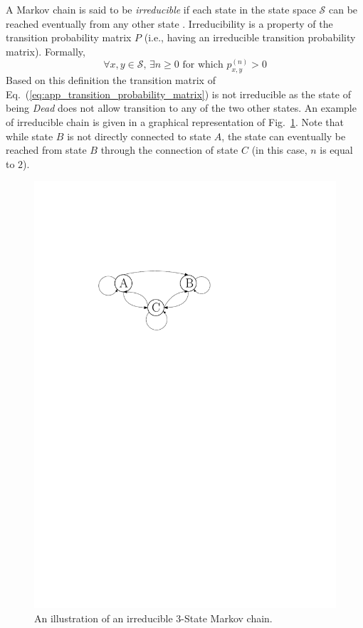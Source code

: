 A Markov chain is said to be \emph{irreducible} if each state in the state space $\mathcal{S}$ can be reached eventually from any other state \cite{Robert2004,Sargent2017}.
Irreducibility is a property of the transition probability matrix $P$ (i.e., having an irreducible transition probability matrix).
Formally,
\begin{equation}
	\forall x, y \in \mathcal{S}, \, \exists n \geq 0 \,\, \text{for which} \,\, p_{x,y}^{(n)} > 0
\label{eq:app_irreducibility}
\end{equation}
Based on this definition the transition matrix of Eq.~(\ref{eq:app_transition_probability_matrix}) is not irreducible as the state of being \emph{Dead} does not allow transition to any of the two other states.
An example of irreducible chain is given in a graphical representation of Fig.~\ref{fig:app_markov_chain_irreducible}.
Note that while state $B$ is not directly connected to state $A$,
the state can eventually be reached from state $B$ through the connection of state $C$ (in this case, $n$ is equal to $2$).
\begin{figure}[bth]
	\centering
	\includegraphics[width=1.0\textwidth]{../figures/chapter5/figures/markov_chain_irreducible.pdf}
	\caption[Illustration of an irreducible $3$-State Markov Chain]{An illustration of an irreducible $3$-State Markov chain.}
	\label{fig:app_markov_chain_irreducible}
\end{figure}


